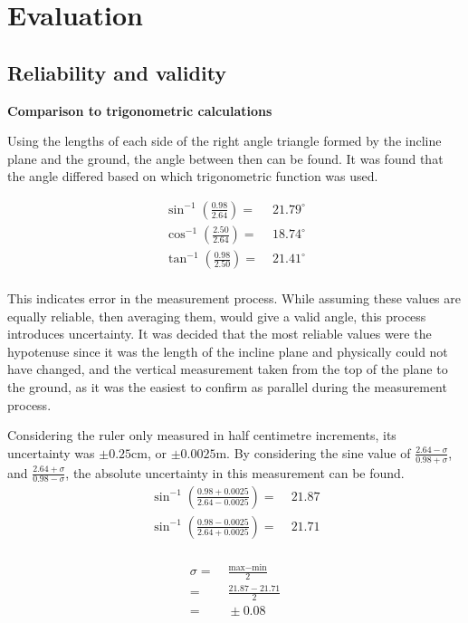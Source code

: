 \documentclass[11pt,a4paper]{article}
\begin{document}
\section{Evaluation}

\subsection{Reliability and validity}


{	\large
	\textbf{Comparison to trigonometric calculations}}

Using the lengths of each side of the right angle triangle formed by the incline plane and the ground, the angle between then can be found. It was found that the angle differed based on which trigonometric function was used. 
 
 \begin{align*}
 	\sin^{-1}\left({\frac{0.98}{2.64}}\right)=&\;21.79^\circ\\
 	\cos^{-1}\left({\frac{2.50}{2.64}}\right)=&\;18.74^\circ\\
 	\tan^{-1}\left({\frac{0.98}{2.50}}\right)=&\;21.41^\circ\\
 \end{align*}
 
 This indicates error in the measurement process. While assuming these values are equally reliable, then averaging them, would give a valid angle, this process introduces uncertainty. It was decided that the most reliable values were the hypotenuse since it was the length of the incline plane and physically could not have changed, and the vertical measurement taken from the top of the plane to the ground, as it was the easiest to confirm as parallel during the measurement process.
 
 Considering the ruler only measured in half centimetre increments, its uncertainty was $\pm 0.25$cm, or $\pm0.0025$m. By considering the sine value of $\frac{2.64-\sigma}{0.98+\sigma}$, and $\frac{2.64+\sigma}{0.98-\sigma}$, the absolute uncertainty in this measurement can be found.
 \begin{align*}
 	 \sin^{-1}\left(\frac{0.98+0.0025}{2.64-0.0025}\right)=&\;21.87\\
 	 \sin^{-1}\left(\frac{0.98-0.0025}{2.64+0.0025}\right)=&\;21.71\\
 \end{align*}

 \begin{align*}
 	\sigma=&\;\frac{\textrm{max}-\textrm{min}}{2}
 	\\
 	=&\;\frac{21.87-21.71}{2}
 	\\
 	=&\;\pm0.08
 \end{align*}
\end{document}
